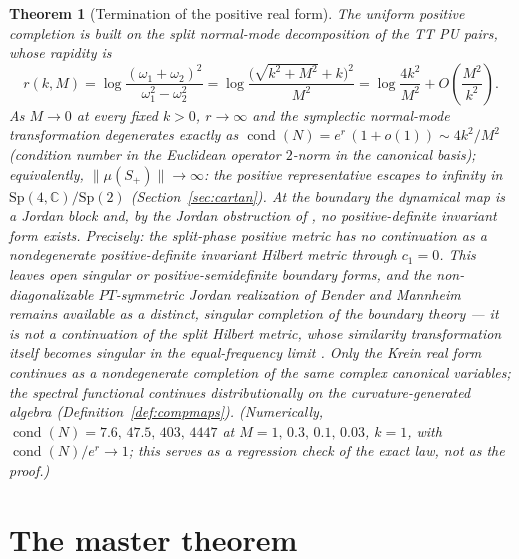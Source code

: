\documentclass[11pt]{article}
\newtheorem{theorem}{Theorem}[section]
\theoremstyle{definition}
\theoremstyle{remark}
\newcommand{\C}{\mathbb{C}}
\newcommand{\w}{\omega}
\newcommand{\Sp}{\mathrm{Sp}}
\begin{document}
\begin{theorem}[Termination of the positive real form]\label{thm:term}
The uniform positive completion is built on the split normal-mode
decomposition of the TT PU pairs, whose rapidity is
\begin{equation}
r(k,M)=\log\frac{(\w_1+\w_2)^2}{\w_1^2-\w_2^2}
=\log\frac{\big(\sqrt{k^2+M^2}+k\big)^2}{M^2}
=\log\frac{4k^2}{M^2}+O\!\left(\frac{M^2}{k^2}\right).
\end{equation}
As $M\to0$ at every fixed $k>0$, $r\to\infty$ and the symplectic
normal-mode transformation degenerates exactly as
$\operatorname{cond}(N)=e^{r}\,(1+o(1))\sim4k^2/M^2$ (condition number in
the Euclidean operator $2$-norm in the canonical basis); equivalently,
$\|\mu(S_+)\|\to\infty$: the positive representative escapes to infinity
in $\Sp(4,\C)/\Sp(2)$ (Section~\ref{sec:cartan}).  At the boundary the
dynamical map is a Jordan block and, by the Jordan obstruction of
\cite{companion1}, no positive-definite invariant form exists.
Precisely: the split-phase positive metric has \emph{no continuation as a
nondegenerate positive-definite invariant Hilbert metric} through
$c_1=0$.  This leaves open singular or positive-semidefinite boundary
forms, and the non-diagonalizable $PT$-symmetric Jordan realization of
Bender and Mannheim \cite{BM2008Jordan,Mannheim2021} remains available
\emph{as a distinct, singular completion of the boundary theory} --- it
is not a continuation of the split Hilbert metric, whose similarity
transformation itself becomes singular in the equal-frequency limit
\cite{BM2008Jordan}.  Only the Krein real form continues as a
nondegenerate completion of the same complex canonical variables; the
spectral functional continues distributionally on the curvature-generated
algebra (Definition~\ref{def:compmaps}).  (Numerically,
$\operatorname{cond}(N)=7.6,\,47.5,\,403,\,4447$ at
$M=1,\,0.3,\,0.1,\,0.03$, $k=1$, with
$\operatorname{cond}(N)/e^{r}\to1$; this serves as a regression check of
the exact law, not as the proof.)
\end{theorem}

\section{The master theorem}\label{sec:master}
\end{document}
